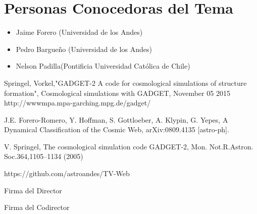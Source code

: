 \documentclass{article}
\begin{document}
\section{Personas Conocedoras del Tema}

\begin{itemize}

\item Jaime Forero (Universidad de los Andes)
\item Pedro Bargueño (Universidad de los Andes)
\item Nelson Padilla(Pontificia Universidad Católica de Chile)

\end{itemize}


\begin{thebibliography}{9}

Springel, Vorkel,"GADGET-2 A code for cosmological simulations of structure formation", Cosmological simulations with GADGET, November 05 2015
http://wwwmpa.mpa-garching.mpg.de/gadget/

J.E. Forero-Romero, Y. Hoffman, S. Gottloeber, A. Klypin, G. Yepes, A Dynamical Classification of the Cosmic Web, arXiv:0809.4135 [astro-ph].

V. Springel, The cosmological simulation code GADGET-2, Mon. Not.R.Astron. Soc.364,1105–1134 (2005)       

https://github.com/astroandes/TV-Web


\end{thebibliography}

Firma del Director


Firma del Codirector
\end{document}
